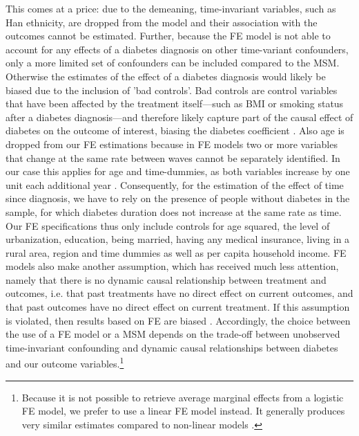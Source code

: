 This comes at a price: due to the demeaning, time-invariant variables, such as Han ethnicity, are dropped from the model and their association with the outcomes cannot be estimated. Further, because the \ac{FE} model is not able to account for any effects of a diabetes diagnosis on other time-variant confounders, only a more limited set of confounders can be included compared to the \ac{MSM}. Otherwise the estimates of the effect of a diabetes diagnosis would likely be biased due to the inclusion of 'bad controls'. Bad controls are control variables that have been affected by the treatment itself---such as \ac{BMI} or smoking status after a diabetes diagnosis---and therefore likely capture part of the causal effect of diabetes on the outcome of interest, biasing the diabetes coefficient \parencite{Angrist2009a}. Also age is dropped from our \ac{FE} estimations because in \ac{FE} models two or more variables that change at the same rate between waves cannot be separately identified. In our case this applies for age and time-dummies, as both variables increase by one unit each additional year \parencite{Wooldridge2012}. Consequently, for the estimation of the effect of time since diagnosis, we have to rely on the presence of people without diabetes in the sample, for which diabetes duration does not increase at the same rate as time. Our \ac{FE} specifications thus only include controls for age squared, the level of urbanization, education, being married, having any medical insurance, living in a rural area, region and time dummies as well as per capita household income.  \ac{FE} models also make another assumption, which has received much less attention, namely that there is no dynamic causal relationship between treatment and outcomes, i.e. that past treatments have no direct effect on current outcomes, and that past outcomes have no direct effect on current treatment. If this assumption is violated, then results based on \ac{FE} are biased \parencite{Imai2016}. Accordingly, the choice between the use of a \ac{FE} model or a \ac{MSM} depends on the trade-off between unobserved time-invariant confounding and dynamic causal relationships between diabetes and our outcome variables.\footnote{Because it is not possible to retrieve average marginal effects from a logistic \ac{FE} model, we prefer to use a linear \ac{FE} model instead. It generally produces very similar estimates compared to non-linear models \parencite{Angrist2009a}.}


